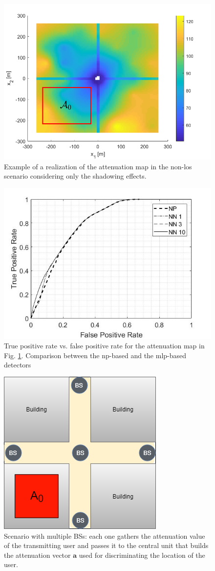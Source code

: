 \documentclass[draftcls,onecolumn,12pt]{IEEEtran}
\begin{document}
\begin{figure}
    \centering
    \includegraphics[width=0.5\columnwidth]{surfColorato.png}
    \caption{Example of a realization of the attenuation map in the non-\ac{los} scenario considering only the shadowing effects.}
    \label{fig:map}
\end{figure}


\begin{figure}
    \centering
    \includegraphics[width=0.5\columnwidth]{trueMap.jpg}
    \caption{True positive rate vs. false positive rate for the attenuation map in Fig. \ref{fig:map}. Comparison between the \ac{np}-based and the \ac{mlp}-based detectors}
    \label{fig:trueMap}
\end{figure}

\begin{figure}
    \centering
    \includegraphics[width=0.3\columnwidth]{scenario2.png}
    \caption{Scenario with multiple BSs: each one gathers the attenuation value of the transmitting user and passes it to the central unit that builds the attenuation vector $\bm{a}$ used for discriminating the location of the user.}
    \label{fig:mBS}
\end{figure}
\end{document}
